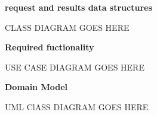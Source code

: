 \documentclass[12pt, oneside]{book}
\begin{document}
\large \bf request and results data structures \par
\small \sf CLASS DIAGRAM GOES HERE\par


\Huge \bf Required fuctionality \par
\small \sf USE CASE DIAGRAM GOES HERE

\Huge \bf Domain Model \par
\small \sf UML ClASS DIAGRAM GOES HERE






\par
\end{document}
